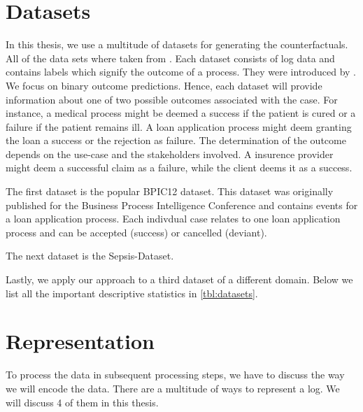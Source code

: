 \documentclass[./../../paper.tex]{subfiles}
\begin{document}
\section{Datasets}
\label{sec:dataset_description}
In this thesis, we use a multitude of datasets for generating the counterfactuals. All of the data sets where taken from \citeauthor{teinemaa_OutcomeOrientedPredictiveProcess_2018a}. Each dataset consists of log data and contains labels which signify the outcome of a process. They were introduced by . We focus on binary outcome predictions. Hence, each dataset will provide information about one of two possible outcomes associated with the case. For instance, a medical process might be deemed a success if the patient is cured or a failure if the patient remains ill. A loan application process might deem granting the loan a success or the rejection as failure. The determination of the outcome depends on the use-case and the stakeholders involved. A insurence provider might deem a successful claim as a failure, while the client deems it as a success.    

The first dataset is the popular BPIC12 dataset. This dataset was originally published for the Business Process Intelligence Conference and contains events for a loan application process. Each indivdual case relates to one loan application process and can be accepted (success) or cancelled (deviant). 

The next dataset is the Sepsis-Dataset. 


Lastly, we apply our approach to a third dataset of a different domain. Below we list all the important descriptive statistics in \autoref{tbl:datasets}.  




\section{Representation}
\label{sec:representation}
To process the data in subsequent processing steps, we have to discuss the way we will encode the data. There are a multitude of ways to represent a log. We will discuss 4 of them in this thesis. 
\end{document}

